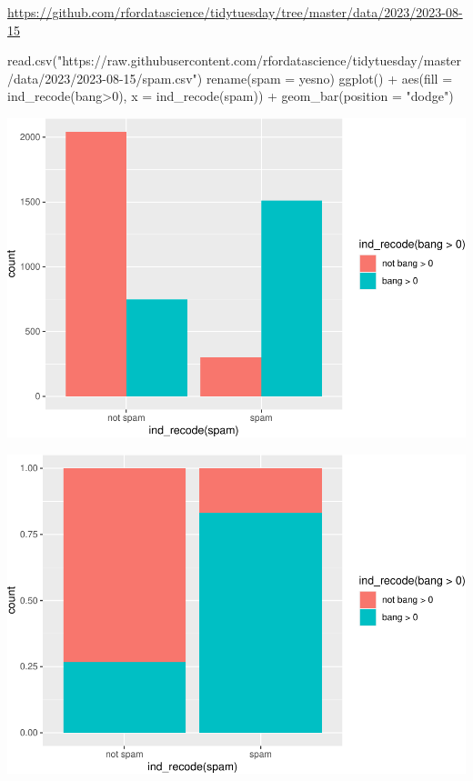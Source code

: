 \url{https://github.com/rfordatascience/tidytuesday/tree/master/data/2023/2023-08-15}

\begin{Schunk}
\begin{Sinput}
read.csv("https://raw.githubusercontent.com/rfordatascience/tidytuesday/master/data/2023/2023-08-15/spam.csv") %
  rename(spam = yesno) %
  ggplot() + 
  aes(fill = ind_recode(bang>0), x = ind_recode(spam)) + 
  geom_bar(position = "dodge")
\end{Sinput}

\includegraphics[width=0.69\linewidth]{r_journal_files/figure-latex/unnamed-chunk-15-1} 

\includegraphics[width=0.69\linewidth]{r_journal_files/figure-latex/unnamed-chunk-15-2} \end{Schunk}

